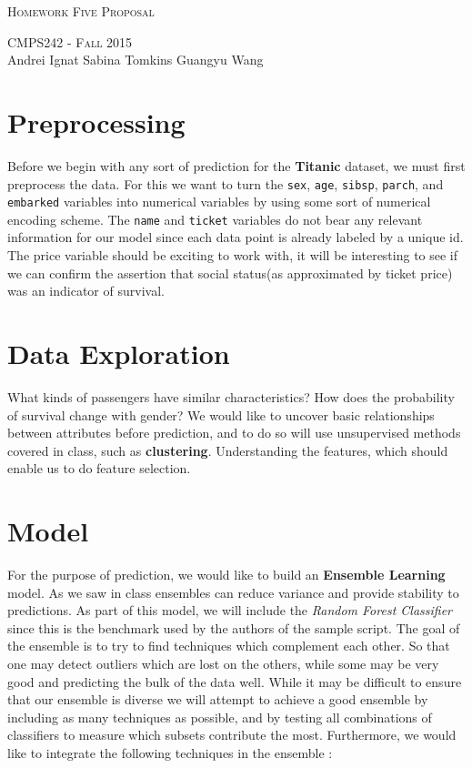 \documentclass{article}
\begin{document}
\begin{center}
\Huge{\textsc{Homework Five Proposal}} 

\Large\textsc{CMPS242 - Fall 2015}\\

\large{Andrei Ignat  \hfill Sabina Tomkins \hfill Guangyu Wang} 
\end{center}

\section*{Preprocessing}
Before we begin with any sort of prediction for the \textbf{Titanic} dataset, we must first preprocess the data. For this we want to turn the \texttt{sex}, \texttt{age}, \texttt{sibsp}, \texttt{parch}, and \texttt{embarked} variables into numerical variables by using some sort of numerical encoding scheme. The \texttt{name} and \texttt{ticket} variables do not bear any relevant information for our model since each data point is already labeled by a unique id. The price variable should be exciting to work with, it will be interesting to see if we can confirm the assertion that social status(as approximated by ticket price) was an indicator of survival. 

\section*{Data Exploration}
What kinds of passengers have similar characteristics? How does the probability of survival change with gender? We would like to uncover basic relationships between attributes before prediction, and to do so will use unsupervised methods covered in class, such as \textbf{clustering}. Understanding the features, which should enable us to do feature selection. 

\section*{Model}
For the purpose of prediction, we would like to build an \textbf{Ensemble Learning} model. As we saw in class ensembles can reduce variance and provide stability to predictions. As part of this model, we will include the \textit{Random Forest Classifier} since this is the benchmark used by the authors of the sample script. The goal of the ensemble is to try to find techniques which complement each other. So that one may detect outliers which are lost on the others, while some may be very good and predicting the bulk of the data well. While it may be difficult to ensure that our ensemble is diverse\cite{diversity} we will attempt to achieve a good ensemble by including as many techniques as possible, and by testing all combinations of classifiers to measure which subsets contribute the most. Furthermore, we would like to integrate the following techniques in the ensemble :
\end{document}
